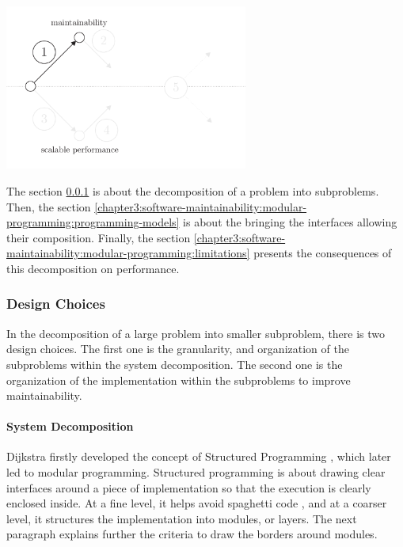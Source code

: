 \begin{center}
\includegraphics[width=0.6\textwidth]{../ressources/state-of-the-art-1.pdf}
\end{center}

The section \ref{chapter3:software-maintainability:modular-programming:design-choices} is about the decomposition of a problem into subproblems.
Then, the section \ref{chapter3:software-maintainability:modular-programming:programming-models} is about the bringing the interfaces allowing their composition.
Finally, the section \ref{chapter3:software-maintainability:modular-programming:limitations} presents the consequences of this decomposition on performance.


\subsubsection{Design Choices} \label{chapter3:software-maintainability:modular-programming:design-choices}

In the decomposition of a large problem into smaller subproblem, there is two design choices.
The first one is the granularity, and organization of the subproblems within the system decomposition.
The second one is the organization of the implementation within the subproblems to improve maintainability.

\paragraph{System Decomposition}


Dijkstra firstly developed the concept of Structured Programming \cite{Dijkstra1970}, which later led to modular programming.
Structured programming is about drawing clear interfaces around a piece of implementation so that the execution is clearly enclosed inside.
At a fine level, it helps avoid spaghetti code \cite{Dijkstra1968a}, and at a coarser level, it structures the implementation \cite{Dijkstra1968} into modules, or layers.
The next paragraph explains further the criteria to draw the borders around modules.

